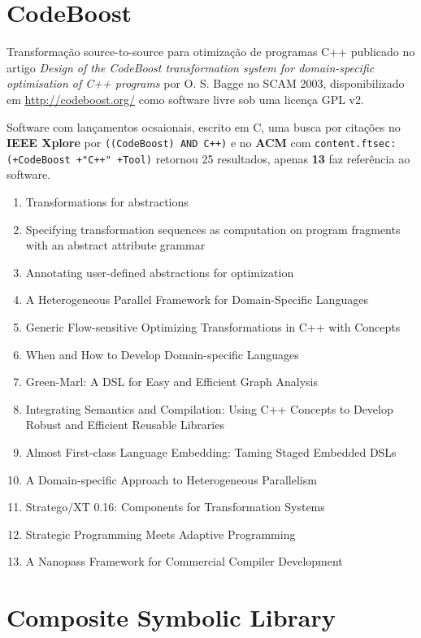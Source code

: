 \section{CodeBoost}

Transformação source-to-source para otimização de programas C++
publicado no artigo {\it Design of the CodeBoost transformation system for domain-specific optimisation of C++ programs}
por O. S. Bagge
no SCAM 2003,
disponibilizado em \url{http://codeboost.org/}
como software livre
sob uma licença GPL v2.

Software com lançamentos ocsaionais,
escrito em C,
uma busca por citações no {\bf IEEE Xplore} por
\texttt{((CodeBoost) AND C++)}
e no {\bf ACM} com
\texttt{content.ftsec:(+CodeBoost +"C++" +Tool)}
retornou
25 resultados, apenas
{\bf 13} faz referência ao software.

\begin{enumerate}
\item Transformations for abstractions
\item Specifying transformation sequences as computation on program fragments with an abstract attribute grammar
\item Annotating user-defined abstractions for optimization
\item A Heterogeneous Parallel Framework for Domain-Specific Languages
\item Generic Flow-sensitive Optimizing Transformations in C++ with Concepts
\item When and How to Develop Domain-specific Languages
\item Green-Marl: A DSL for Easy and Efficient Graph Analysis
\item Integrating Semantics and Compilation: Using C++ Concepts to Develop Robust and Efficient Reusable Libraries
\item Almost First-class Language Embedding: Taming Staged Embedded DSLs
\item A Domain-specific Approach to Heterogeneous Parallelism
\item Stratego/XT 0.16: Components for Transformation Systems
\item Strategic Programming Meets Adaptive Programming
\item A Nanopass Framework for Commercial Compiler Development
\end{enumerate}


\section{Composite Symbolic Library}

